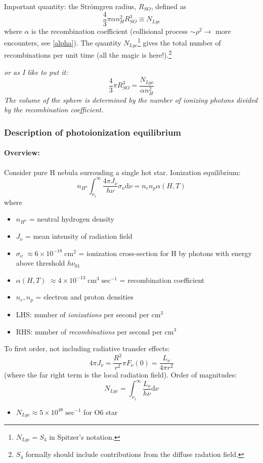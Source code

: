 \documentclass[11pt]{article}
\newcommand{\mar}[1]{\hspace{0pt}\marginpar{-\textcolor{black}{#1}-}}
\newcommand{\mynotes}[1]{{\fontfamily{cmss}\selectfont \textit{#1}}}
\begin{document}
Important quantity: the Str\"{o}mgren radius, $R_{SO}$, defined as
\[
    \frac{4}{3}\pi\alpha{n_{H}^{2}}{R_{SO}^{3}} \equiv N_{Lyc}
    \]
where $\alpha$ is the recombination coefficient
(collisional process $\sim\rho^{2} \rightarrow$ more encounters, see \ref{alpha}).
The quantity $N_{Lyc}$\footnote{$N_{Lyc} = S_{4}$ in Spitzer's notation.}
gives the total number of recombinations per unit
time (all the magic is here!).\footnote{$S_{4}$ formally should include
contributions from the diffuse radation field.}

\mynotes{or as I like to put it:
\[
    \frac{4}{3}\pi{R_{SO}^{3}} = \frac{ N_{Lyc}}{\alpha{n_{H}^{2}}}
    \]
The volume of the sphere is determined by the number of ionizing photons
divided by the recombination coefficient.}

\subsubsection{Description of photoionization equilibrium}
\mar{53}
\paragraph{Overview:} Consider pure H nebula surrouding a single hot star.
Ionization equilibrium:
\[
    n_{H^{o}}\int_{\nu_{1}}^{\infty}{
        \frac{4\pi{J_{\nu}}}{h\nu}\sigma_{\nu}\mathrm{d}\nu}
    = n_{e}n_{p}\alpha(H,T)
    \]
where
\begin{itemize}
    \item $n_{H^{o}}$ = neutral hydrogen density
    \item $J_{\nu}$ = mean intensity of radiation field
    \item $\sigma_{\nu}$
        $ \approx 6\times10^{-18}\;\mathrm{cm}^{2} $
        = ionization cross-section for H by photons with
        energy above threshold $h\nu_{01}$
    \item $\alpha(H,T)$
        $ \approx 4\times10^{-13}\;\mathrm{cm}^{3}\;\mathrm{sec}^{-1} $
        = recombination coefficient
    \item $n_{e}, n_{p}$ = electron and proton densities
    \item LHS: number of \emph{ionizations} per second per cm$^{3}$
    \item RHS: number of \emph{recombinations} per second per cm$^{3}$
\end{itemize}
To first order, not including radiative transfer effects:
\[
    4\pi{J_{\nu}} = \frac{R^{2}}{r^{2}}\pi{F_{\nu}}(0) =
    \frac{L_{\nu}}{4\pi{r^{2}}}
    \]
(where the far right term is the local radiation field). Order of magnitudes:
\[
    N_{Lyc} = \int_{\nu_{1}}^{\infty}{\frac{L_{\nu}}{h\nu}\mathrm{d}\nu}
    \]
\begin{itemize}
    \item $N_{Lyc} \approx 5\times10^{48}\;\mathrm{sec}^{-1}$ for O6 star
\end{itemize}
\end{document}
